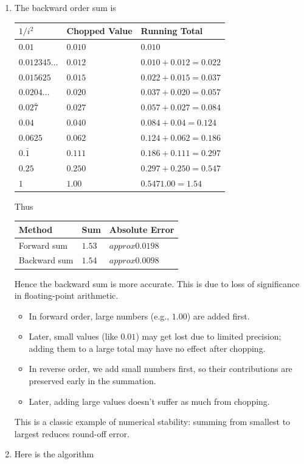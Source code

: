 \begin{myexercise}

\begin{mysolution}
\begin{enumerate}[label=(\alph*)]
\item[]
The backward order sum is
\begin{center}
\begin{tabular}{|l|l|l|}\hline
$1/i^2$&Chopped Value&Running Total\\\hline
$0.01$&$0.010$&$0.010$\\
$0.012345\ldots$&$0.012$&$0.010+0.012=0.022$\\
$0.015625$&$0.015$&$0.022+0.015=0.037$\\
$0.0204\ldots$&$0.020$&$0.037+0.020=0.057$\\
$0.02\bar{7}$&$0.027$&$0.057+0.027=0.084$\\
$0.04$&$0.040$&$0.084+0.04=0.124$\\
$0.0625$&$0.062$&$0.124+0.062=0.186$\\
$0.\bar{1}$&$0.111$&$0.186+0.111=0.297$\\
$0.25$&$0.250$&$0.297+0.250=0.547$\\
$1$&$1.00$&$0.5471.00=1.54$\\\hline
\end{tabular}
\end{center}
Thus
\begin{center}
\begin{tabular}{|l|l|l|}\hline
Method&Sum&Absolute Error\\\hline
Forward sum&$1.53$&$approx0.0198$\\
Backward sum&$1.54$&$approx0.0098$\\\hline
\end{tabular}
\end{center}
Hence the backward sum is more accurate. This is due to loss of significance in floating-point arithmetic.

\begin{itemize}
\item In forward order, large numbers (e.g., $1.00$) are added first.
\item Later, small values (like $0.01$) may get lost due to limited precision; adding them to a large total may have no effect after chopping.
\item In reverse order, we add small numbers first, so their contributions are preserved early in the summation.
\item Later, adding large values doesn't suffer as much from chopping.
\end{itemize}
This is a classic example of numerical stability: summing from smallest to largest reduces round-off error.
\item [(b)] Here is the algorithm


\end{enumerate}
\end{mysolution}
\end{myexercise}
